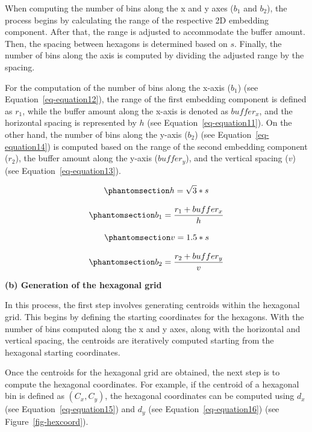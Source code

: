 \documentclass[
  12pt]{article}
\begin{document}
When computing the number of bins along the x and y axes (\(b_1\) and
\(b_2\)), the process begins by calculating the range of the respective
2D embedding component. After that, the range is adjusted to accommodate
the buffer amount. Then, the spacing between hexagons is determined
based on \(s\). Finally, the number of bins along the axis is computed
by dividing the adjusted range by the spacing.

For the computation of the number of bins along the x-axis (\(b_1\))
(see Equation~\ref{eq-equation12}), the range of the first embedding
component is defined as \(r_1\), while the buffer amount along the
x-axis is denoted as \(buffer_{x}\), and the horizontal spacing is
represented by \(h\) (see Equation~\ref{eq-equation11}). On the other
hand, the number of bins along the y-axis (\(b_2\)) (see
Equation~\ref{eq-equation14}) is computed based on the range of the
second embedding component (\(r_2\)), the buffer amount along the y-axis
(\(buffer_{y}\)), and the vertical spacing (\(v\)) (see
Equation~\ref{eq-equation13}).

\begin{equation}\phantomsection\label{eq-equation11}{
 h = \sqrt{3} * s
}\end{equation}

\begin{equation}\phantomsection\label{eq-equation12}{
 b_1 = \frac{r_1 + buffer_{x}}{h}
}\end{equation}

\begin{equation}\phantomsection\label{eq-equation13}{
  v = 1.5 * s
}\end{equation}

\begin{equation}\phantomsection\label{eq-equation14}{
 b_2 = \frac{r_2 + buffer_{y}}{v}
}\end{equation}

\textbf{(b) Generation of the hexagonal grid}

In this process, the first step involves generating centroids within the
hexagonal grid. This begins by defining the starting coordinates for the
hexagons. With the number of bins computed along the x and y axes, along
with the horizontal and vertical spacing, the centroids are iteratively
computed starting from the hexagonal starting coordinates.

Once the centroids for the hexagonal grid are obtained, the next step is
to compute the hexagonal coordinates. For example, if the centroid of a
hexagonal bin is defined as \((C_x, C_y)\), the hexagonal coordinates
can be computed using \(d_x\) (see Equation~\ref{eq-equation15}) and
\(d_y\) (see Equation~\ref{eq-equation16}) (see
Figure~\ref{fig-hexcoord}).
\end{document}
